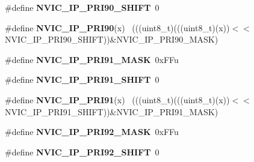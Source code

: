 \begin{DoxyCompactItemize}
\item 
\hypertarget{group___n_v_i_c___register___masks_ga7d716d2bb34c4c4fbced0ee7c3b415af}{}\#define {\bfseries N\+V\+I\+C\+\_\+\+I\+P\+\_\+\+P\+R\+I90\+\_\+\+S\+H\+I\+F\+T}~0\label{group___n_v_i_c___register___masks_ga7d716d2bb34c4c4fbced0ee7c3b415af}

\item 
\hypertarget{group___n_v_i_c___register___masks_ga2e50e71f91d4a54cb442105a9a917c0d}{}\#define {\bfseries N\+V\+I\+C\+\_\+\+I\+P\+\_\+\+P\+R\+I90}(x)                                              ~(((uint8\+\_\+t)(((uint8\+\_\+t)(x))$<$$<$N\+V\+I\+C\+\_\+\+I\+P\+\_\+\+P\+R\+I90\+\_\+\+S\+H\+I\+F\+T))\&N\+V\+I\+C\+\_\+\+I\+P\+\_\+\+P\+R\+I90\+\_\+\+M\+A\+S\+K)\label{group___n_v_i_c___register___masks_ga2e50e71f91d4a54cb442105a9a917c0d}

\item 
\hypertarget{group___n_v_i_c___register___masks_gaa4400d9a5197630f5c6657cc8f211601}{}\#define {\bfseries N\+V\+I\+C\+\_\+\+I\+P\+\_\+\+P\+R\+I91\+\_\+\+M\+A\+S\+K}~0x\+F\+Fu\label{group___n_v_i_c___register___masks_gaa4400d9a5197630f5c6657cc8f211601}

\item 
\hypertarget{group___n_v_i_c___register___masks_ga5b285c15d3c329493ff3a9717f9149c0}{}\#define {\bfseries N\+V\+I\+C\+\_\+\+I\+P\+\_\+\+P\+R\+I91\+\_\+\+S\+H\+I\+F\+T}~0\label{group___n_v_i_c___register___masks_ga5b285c15d3c329493ff3a9717f9149c0}

\item 
\hypertarget{group___n_v_i_c___register___masks_ga7a70796338a22c88a298d2786ef2ca8a}{}\#define {\bfseries N\+V\+I\+C\+\_\+\+I\+P\+\_\+\+P\+R\+I91}(x)                                              ~(((uint8\+\_\+t)(((uint8\+\_\+t)(x))$<$$<$N\+V\+I\+C\+\_\+\+I\+P\+\_\+\+P\+R\+I91\+\_\+\+S\+H\+I\+F\+T))\&N\+V\+I\+C\+\_\+\+I\+P\+\_\+\+P\+R\+I91\+\_\+\+M\+A\+S\+K)\label{group___n_v_i_c___register___masks_ga7a70796338a22c88a298d2786ef2ca8a}

\item 
\hypertarget{group___n_v_i_c___register___masks_ga4e928a27abcbdb46f3419a6628076073}{}\#define {\bfseries N\+V\+I\+C\+\_\+\+I\+P\+\_\+\+P\+R\+I92\+\_\+\+M\+A\+S\+K}~0x\+F\+Fu\label{group___n_v_i_c___register___masks_ga4e928a27abcbdb46f3419a6628076073}

\item 
\hypertarget{group___n_v_i_c___register___masks_gad35a051e4a62c4936aa6f82d7f1fd78f}{}\#define {\bfseries N\+V\+I\+C\+\_\+\+I\+P\+\_\+\+P\+R\+I92\+\_\+\+S\+H\+I\+F\+T}~0\label{group___n_v_i_c___register___masks_gad35a051e4a62c4936aa6f82d7f1fd78f}


\end{DoxyCompactItemize}

